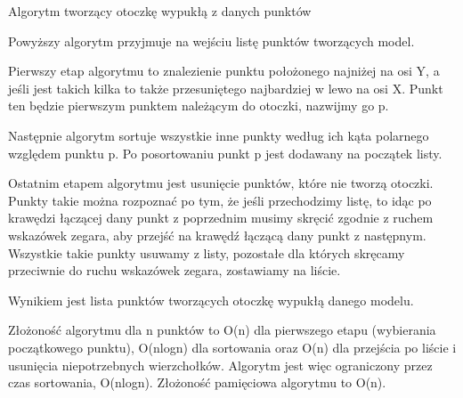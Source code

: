 \begin{algorithm}[H]
	\caption{Algorytm tworzący otoczkę wypukłą z danych punktów}
\end{algorithm}\bigskip

\noindent Powyższy algorytm przyjmuje na wej\'sciu listę punktów tworzących model.

Pierwszy etap algorytmu to znalezienie punktu położonego najniżej na osi Y, a je\'sli jest takich kilka to także przesuniętego najbardziej w lewo na osi X. Punkt ten będzie pierwszym punktem należącym do otoczki, nazwijmy go p.

Następnie algorytm sortuje wszystkie inne punkty według ich kąta polarnego względem punktu p. Po posortowaniu punkt p jest dodawany na początek listy.

Ostatnim etapem algorytmu jest usunięcie punktów, które nie tworzą otoczki. Punkty takie można rozpoznać po tym, że je\'sli przechodzimy listę, to idąc po krawędzi łączącej dany punkt z poprzednim musimy skręcić zgodnie z ruchem wskazówek zegara, aby przej\'sć na krawędź łączącą dany punkt z następnym. Wszystkie takie punkty usuwamy z listy, pozostałe dla których skręcamy przeciwnie do ruchu wskazówek zegara, zostawiamy na li\'scie.

Wynikiem jest lista punktów tworzących otoczkę wypukłą danego modelu.

Złożono\'sć algorytmu dla n punktów to O(n) dla pierwszego etapu (wybierania początkowego punktu), O(nlogn) dla sortowania oraz O(n) dla przej\'scia po li\'scie i usunięcia niepotrzebnych wierzchołków. Algorytm jest więc ograniczony przez czas sortowania, O(nlogn). Złożono\'sć pamięciowa algorytmu to O(n).

